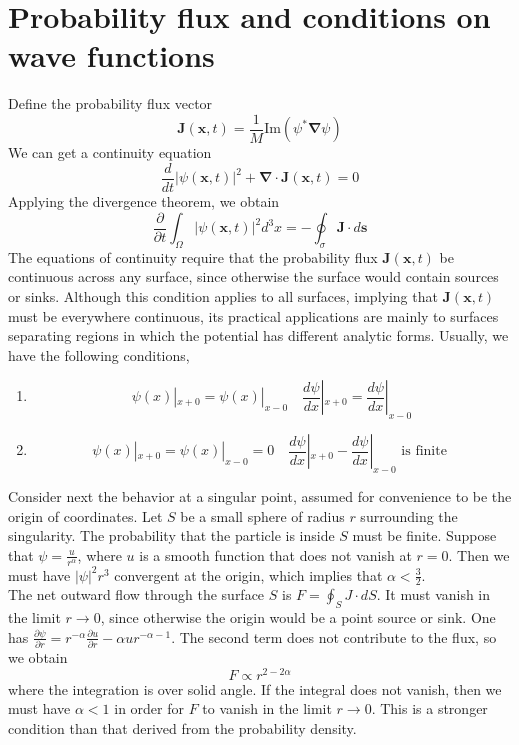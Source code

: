 \section{Probability flux and conditions on wave functions}
\noindent
Define the probability flux vector
\[\bm{J}(\bm{x},t) = \frac{1}{M} \mathrm{Im}(\psi^*\bm{\nabla}\psi)\]
We can get a continuity equation
\[\frac{d}{dt} |\psi(\bm{x},t)|^2 + \bm{\nabla} \cdot \bm{J}(\bm{x},t) = 0\]
Applying the divergence theorem, we obtain
\[\frac{\partial}{\partial t} \int_{\Omega} |\psi(\bm{x},t)|^2 d^3x = - \oint_{\sigma} \bm{J} \cdot d\bm{s}\]
The equations of continuity require that the probability
flux $\bm{J}(\bm{x},t)$ be continuous across any surface, since otherwise the surface would contain sources or sinks. Although this condition applies to all surfaces, implying that $\bm{J}(\bm{x},t)$ must be everywhere continuous, its practical applications are mainly to surfaces separating regions in which the potential has different analytic forms.
Usually, we have the following conditions,
\begin{enumerate}
\item \[\psi(x)|_{x+0} = \psi(x)|_{x-0} \quad \frac{d\psi}{dx}|_{x+0} = \frac{d\psi}{dx}|_{x-0}\]
\item \[\psi(x)|_{x+0} = \psi(x)|_{x-0} = 0 \quad \frac{d\psi}{dx}|_{x+0} - \frac{d\psi}{dx}|_{x-0} \mbox{ is finite }\]
\end{enumerate}
\noindent
Consider next the behavior at a singular point, assumed for convenience to be the origin of coordinates. Let $S$ be a small sphere of radius $r$ surrounding the singularity. The probability that the particle is inside $S$ must be finite.
Suppose that $\psi = \frac{u}{r^{\alpha}}$, where $u$ is a smooth function that does not vanish at $r=0$. Then we must have $|\psi|^2 r^3$ convergent at the origin, which implies that $\alpha < \frac{3}{2}$.\\
The net outward flow through the surface $S$ is $F = \oint_{S} J \cdot dS$. It must vanish in the limit $r \to 0$, since otherwise the origin would be a point source or sink.
One has $\frac{\partial \psi}{\partial r} = r^{-\alpha} \frac{\partial u}{\partial r} - \alpha u r^{-\alpha-1}$. The second term does not contribute to the flux, so we obtain
\[F \propto r^{2-2\alpha}\]
where the integration is over solid angle. If the integral does not vanish, then we must have $\alpha <1$ in order for $F$ to vanish in the limit $r \to 0$. This is a stronger condition than that derived from the probability density. \\
